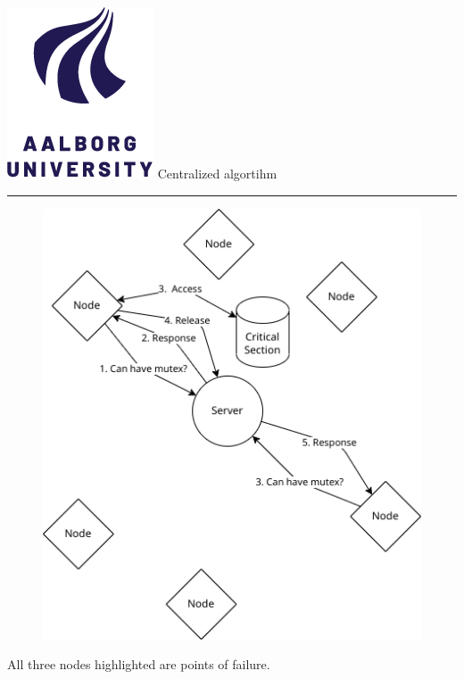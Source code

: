 \documentclass[aspectratio=1610,17pt,utf8]{beamer}
\newcommand{\regularframe}[1]{\color{black}\includegraphics[width=.05\textwidth]{figures/aau.png} #1\\\hrule}
\begin{document}
\begin{frame}{\regularframe{Centralized algortihm}}
    \begin{minipage}{.45\textwidth}
        \begin{figure}
            \includegraphics[width=\textwidth]{figures/1-mutex.png}
        \end{figure}
    \end{minipage}
    \begin{minipage}{.5\textwidth}
        \tiny{All three nodes highlighted are points of failure.}
    \end{minipage}
\end{frame}
\end{document}
